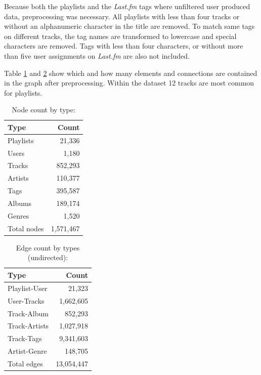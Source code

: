 \documentclass[sigconf]{acmart}
\begin{document}
Because both the playlists and the \emph{Last.fm} tags where unfiltered user produced data, preprocessing was necessary. All playlists with less than four tracks or without an alphanumeric character in the title are removed. To match same tags on different tracks, the tag names are transformed to lowercase and special characters are removed. Tags with less than four characters, or without more than five user assignments on \emph{Last.fm} are also not included.

Table \ref{table:node_count} and \ref{table:edge_count} show which and how many elements and connections are contained in the graph after preprocessing. Within the dataset 12 tracks are most common for playlists.

\begin{table}[H]
	\caption{Node count by type:}
	\label{table:node_count}
	\begin{tabular}{lr}
		\midrule 
		\textbf{Type} & \textbf{Count} \\ 
		\midrule 
		Playlists & 21,336  \\
		Users     & 1,180     \\
		Tracks    & 852,293 \\
		Artists   & 110,377  \\
		Tags      & 395,587    \\
		Albums    & 189,174    \\
		Genres	  & 1,520	\\
		\midrule 
		Total nodes & 1,571,467\\
		\bottomrule
	\end{tabular}
\end{table}

\begin{table}[H]
	\caption{Edge count by types (undirected):}
	\label{table:edge_count}
	\begin{tabular}{lr}
		\midrule 
		\textbf{Type} & \textbf{Count} \\ 
		\midrule 
		Playlist-User   & 21,323  \\
		User-Tracks     & 1,662,605     \\
		Track-Album		& 852,293 \\
		Track-Artists   & 1,027,918 \\
		Track-Tags   	& 9,341,603 \\
		Artist-Genre	& 148,705  \\
		\midrule 
		Total edges 	& 13,054,447\\
		\bottomrule
	\end{tabular}
\end{table}
\end{document}
